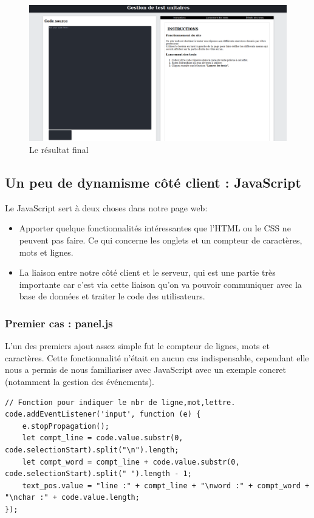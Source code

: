 \documentclass[a4paper]{article}
\begin{document}
  \begin{figure}[htbp]
    \centering
    \includegraphics[scale=0.25]{./img_rapport/page_web_v2.png}
   \caption{Le résultat final}
   \label{fig-page-web-v2}
 \end{figure}

\newpage
\subsection{Un peu de dynamisme côté client : JavaScript}

Le JavaScript sert à deux choses dans notre page web:
\begin{itemize}
\item Apporter quelque fonctionnalités intéressantes que l'HTML ou le CSS ne
  peuvent pas faire. Ce qui concerne les onglets et un compteur de caractères,
  mots et lignes.
\item La liaison entre notre côté client et le serveur, qui est une partie très
  importante car c'est via cette liaison qu'on va pouvoir communiquer avec la
  base de données et traiter le code des utilisateurs.
\end{itemize}

\subsubsection{Premier cas : panel.js}

L'un des premiers ajout assez simple fut le compteur de lignes, mots et
caractères. Cette fonctionnalité n'était en aucun cas indispensable, cependant
elle nous a permis de nous familiariser avec JavaScript avec un exemple
concret (notamment la gestion des événements).

\begin{lstlisting}[language=JS]
// Fonction pour indiquer le nbr de ligne,mot,lettre.
code.addEventListener('input', function (e) {
    e.stopPropagation();
    let compt_line = code.value.substr(0, code.selectionStart).split("\n").length;
    let compt_word = compt_line + code.value.substr(0, code.selectionStart).split(" ").length - 1;
    text_pos.value = "line :" + compt_line + "\nword :" + compt_word + "\nchar :" + code.value.length;
});
\end{lstlisting}
\end{document}
